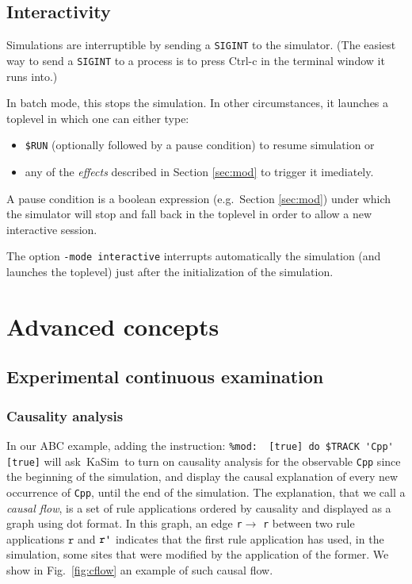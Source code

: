 \documentclass[11pt]{book}
\def\KaSim{\textsf{KaSim}}
\def\ttt#1{\texttt{#1}}
\def\noi{\noindent}
\def\eg{e.g.~}
\begin{document}
\section{Interactivity}
Simulations are interruptible by sending a \verb:SIGINT: to the
simulator. (The easiest way to send a \verb:SIGINT: to a process is to
press Ctrl-c in the terminal window it runs into.)

In batch mode, this stops the simulation. In other circumstances, it
launches a toplevel in which one can either type:
\begin{itemize}
\item \verb:$RUN: (optionally followed by a pause condition) to resume
  simulation or
\item any of the \emph{effects} described in Section \ref{sec:mod} to trigger it imediately.
\end{itemize}

A pause condition is a boolean expression ({\eg}Section \ref{sec:mod}) under which the simulator will stop and fall back in
the toplevel in order to allow a new interactive session.

The option \ttt{-mode interactive} interrupts automatically the
simulation (and launches the toplevel) just after the initialization
of the simulation.

\chapter{Advanced concepts}\label{chap:advanced}

\section{Experimental continuous examination}
\subsection{Causality analysis}\label{sec:cflows}

In our ABC example, adding the instruction:
\lstinline[language=kappa]!%mod:  [true] do $TRACK 'Cpp' [true]!
\noi will ask~\KaSim~to turn on causality analysis for the observable \ttt{{\textquotesingle}Cpp{\textquotesingle}} since the beginning of the simulation, and display the causal explanation of every new occurrence of \ttt{{\textquotesingle}Cpp{\textquotesingle}}, until the end of the simulation. The explanation, that we call a \emph{causal flow}, is a set of rule applications ordered by causality and displayed as a graph using dot format. In this graph, an edge \ttt{r}$\longrightarrow$ \ttt{r{\textquotesingle}} between two rule applications $\ttt{r}$ and $\ttt{r{\textquotesingle}}$ indicates that the first rule application has used, in the simulation, some sites that were modified by the application of the former. We show in Fig.~\ref{fig:cflow} an example of such causal flow.
\end{document}

